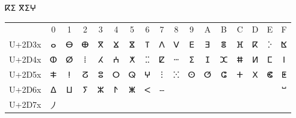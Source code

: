 ⴽⵉ ⴳⵉⵖ



\begin{tabular}{*{17}{c}}
&
0&
1&
2&
3&
4&
5&
6&
7&
8&
9&
A&
B&
C&
D&
E&
F
\\
U+2D3x&
ⴰ&
ⴱ&
ⴲ&
ⴳ&
ⴴ&
ⴵ&
ⴶ&
ⴷ&
ⴸ&
ⴹ&
ⴺ&
ⴻ&
ⴼ&
ⴽ&
ⴾ&
ⴿ
\\
U+2D4x&
ⵀ&
ⵁ&
ⵂ&
ⵃ&
ⵄ&
ⵅ&
ⵆ&
ⵇ&
ⵈ&
ⵉ&
ⵊ&
ⵋ&
ⵌ&
ⵍ&
ⵎ&
ⵏ
\\
U+2D5x&
ⵐ&
ⵑ&
ⵒ&
ⵓ&
ⵔ&
ⵕ&
ⵖ&
ⵗ&
ⵘ&
ⵙ&
ⵚ&
ⵛ&
ⵜ&
ⵝ&
ⵞ&
ⵟ
\\
U+2D6x&
ⵠ&
ⵡ&
ⵢ&
ⵣ&
ⵤ&
ⵥ&
ⵦ&
ⵧ&
&
&
&
&
&
&
&
ⵯ
\\
U+2D7x&
⵰&
&
&
&
&
&
&
&
&
&
&
&
&
&
&
\end{tabular}